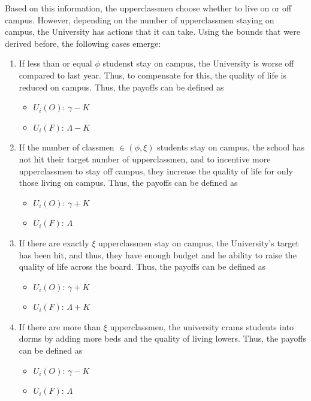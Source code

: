 \documentclass[12pt]{article}
\begin{document}
Based on this information, the upperclassmen choose whether to live on or off campus.
However, depending on the number of upperclassmen staying on campus, the University has actions that it can take. Using the bounds that were derived before, the following cases emerge:
\begin{enumerate}
    \item If less than or equal $\phi$ studenst stay on campus, the University is worse off compared to last year. Thus, to compensate for this, the quality of life is reduced on campus. Thus, the payoffs can be defined as \begin{itemize}
        \item $U_i(O)$: $\gamma - K$
        \item $U_i(F)$: $\Lambda - K$
    \end{itemize}
    \item If the number of classmen  $ \in (\phi,\xi)$ students stay on campus, the school has not hit their target number of upperclassmen, and to incentive more upperclassmen to stay off campus, they increase the quality of life for only those living on campus. Thus, the payoffs can be defined as \begin{itemize}
        \item $U_i(O)$: $\gamma + K$
        \item $U_i(F)$: $\Lambda$
    \end{itemize}
    \item If there are exactly $\xi$ upperclassmen stay on campus, the University's target has been hit, and thus, they have enough budget and he ability to raise the quality of life across the board. Thus, the payoffs can be defined as \begin{itemize}
        \item $U_i(O)$: $\gamma + K$
        \item $U_i(F)$: $\Lambda + K$
    \end{itemize}
    \item If there are more than $\xi$ upperclassmen, the university crams students into dorms by adding more beds and the quality of living lowers. Thus, the payoffs can be defined as \begin{itemize}
        \item $U_i(O)$: $\gamma - K$
        \item $U_i(F)$: $\Lambda$
    \end{itemize}
\end{enumerate}
\end{document}
